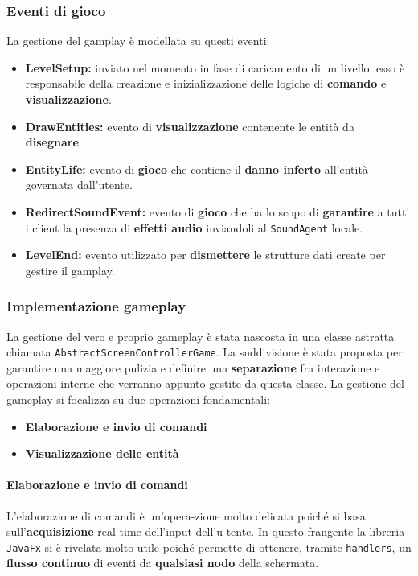 \subsubsection{Eventi di gioco}
La gestione del gamplay è modellata su questi eventi:
\begin{itemize}
	\item{\textbf{LevelSetup:}} inviato nel momento in fase di caricamento di un livello: esso è responsabile della creazione e inizializzazione delle logiche di \textbf{comando} e \textbf{visualizzazione}.
	\item{\textbf{DrawEntities:}} evento di \textbf{visualizzazione} contenente le entità da \textbf{disegnare}.
	\item{\textbf{EntityLife:}} evento di \textbf{gioco} che contiene il \textbf{danno inferto} all'entità governata dall'utente.
	\item{\textbf{RedirectSoundEvent:}} evento di \textbf{gioco} che ha lo scopo di \textbf{garantire} a tutti i client la presenza di \textbf{effetti audio} inviandoli al \texttt{SoundAgent} locale.
	\item{\textbf{LevelEnd:}} evento utilizzato per \textbf{dismettere} le strutture dati create per gestire il gamplay.
\end{itemize}

\subsubsection{Implementazione gameplay}
La gestione del vero e proprio gameplay è stata nascosta in una classe astratta chiamata \texttt{AbstractScreenControllerGame}. La suddivisione è stata proposta per garantire una maggiore pulizia e definire una \textbf{separazione} fra interazione e operazioni interne che verranno appunto gestite da questa classe. La gestione del gameplay si focalizza su due operazioni fondamentali:
\begin{itemize}
	\item{\textbf{Elaborazione e invio di comandi}}
	\item{\textbf{Visualizzazione delle entità}}
\end{itemize}

\paragraph{Elaborazione e invio di comandi}
L'elaborazione di comandi è un'opera-zione molto delicata poiché si basa sull'\textbf{acquisizione} real-time dell'input dell'u-tente. In questo frangente la libreria \texttt{JavaFx} si è rivelata molto utile poiché permette di ottenere, tramite \texttt{handlers}, un \textbf{flusso continuo} di eventi da \textbf{qualsiasi nodo} della schermata.

